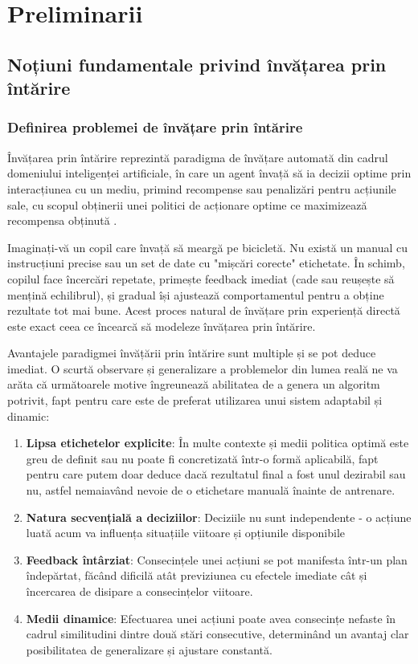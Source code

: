 \chapter{Preliminarii}

\section{Noțiuni fundamentale privind învățarea prin întărire}
\subsection{Definirea problemei de învățare prin întărire}

Învățarea prin întărire reprezintă paradigma de învățare automată din cadrul domeniului inteligenței artificiale, în care un agent învață să ia decizii optime prin interacțiunea cu un mediu, primind recompense sau penalizări pentru acțiunile sale, cu scopul obținerii unei politici de acționare optime ce maximizează recompensa obținută \cite{reinforcement_learning_book}.

Imaginați-vă un copil care învață să meargă pe bicicletă. Nu există un manual cu instrucțiuni precise sau un set de date cu "mișcări corecte" etichetate. În schimb, copilul face încercări repetate, primește feedback imediat (cade sau reușește să mențină echilibrul), și gradual își ajustează comportamentul pentru a obține rezultate tot mai bune. Acest proces natural de învățare prin experiență directă este exact ceea ce încearcă să modeleze învățarea prin întărire.

Avantajele paradigmei învățării prin întărire sunt multiple și se pot deduce imediat. O scurtă observare și generalizare a problemelor din lumea reală ne va arăta că următoarele motive îngreunează abilitatea de a genera un algoritm potrivit, fapt pentru care este de preferat utilizarea unui sistem adaptabil și dinamic:
\begin{enumerate}
    \item \textbf{Lipsa etichetelor explicite}: În multe contexte și medii politica optimă este greu de definit sau nu poate fi concretizată într-o formă aplicabilă, fapt pentru care putem doar deduce dacă rezultatul final a fost unul dezirabil sau nu, astfel nemaiavând nevoie de o etichetare manuală înainte de antrenare.
    \item \textbf{Natura secvențială a deciziilor}: Deciziile nu sunt independente - o acțiune luată acum va influența situațiile viitoare și opțiunile disponibile
    \item \textbf{Feedback întârziat}: Consecințele unei acțiuni se pot manifesta într-un plan îndepărtat, făcând dificilă atât previziunea cu efectele imediate cât și încercarea de disipare a consecințelor viitoare.
    \item \textbf{Medii dinamice}: Efectuarea unei acțiuni poate avea consecințe nefaste în cadrul similitudini dintre două stări consecutive, determinând un avantaj clar posibilitatea de generalizare și ajustare constantă.
\end{enumerate}

